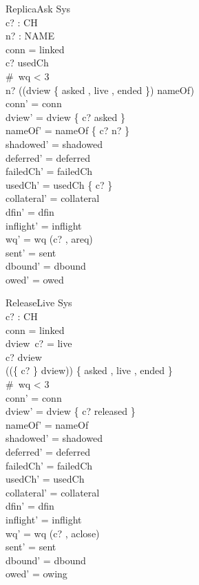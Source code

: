 \documentclass[a4paper,10pt,fleqn]{article}
\begin{document}
\begin{schema}{ReplicaAsk}
  \Delta Sys \\
  c? : CH \\
  n? : NAME \\
\where
  conn = linked \\
  c? \notin usedCh \\
  \#~wq < 3 \\
  n? \notin \ran (\dom (dview \rres \{ asked , live , ended \}) \dres nameOf) \\
  conn' = conn \\
  dview' = dview \oplus \{ c? \mapsto asked \} \\
  nameOf' = nameOf \cup \{ c? \mapsto n? \} \\
  shadowed' = shadowed \\
  deferred' = deferred \\
  failedCh' = failedCh \\
  usedCh' = usedCh \cup \{ c? \} \\
  collateral' = collateral \\
  dfin' = dfin \\
  inflight' = inflight \\
  wq' = wq \cat \langle (c? , areq) \rangle \\
  sent' = sent \\
  dbound' = dbound \\
  owed' = owed
\end{schema}

\begin{schema}{ReleaseLive}
  \Delta Sys \\
  c? : CH \\
\where
  conn = linked \\
  dview~c? = live \\
  c? \in \dom dview \\
  (\ran (\{ c? \} \ndres dview)) \cap \{ asked , live , ended \} \neq \emptyset \\
  \#~wq < 3 \\
  conn' = conn \\
  dview' = dview \oplus \{ c? \mapsto released \} \\
  nameOf' = nameOf \\
  shadowed' = shadowed \\
  deferred' = deferred \\
  failedCh' = failedCh \\
  usedCh' = usedCh \\
  collateral' = collateral \\
  dfin' = dfin \\
  inflight' = inflight \\
  wq' = wq \cat \langle (c? , aclose) \rangle \\
  sent' = sent \\
  dbound' = dbound \\
  owed' = owing
\end{schema}
\end{document}
